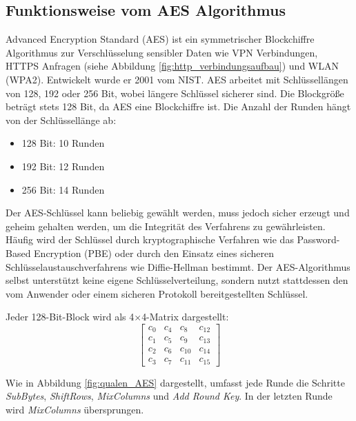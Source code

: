 \subsection{Funktionsweise vom AES Algorithmus}
\label{sec:aes}
\setlength{\parindent}{0pt}

Advanced Encryption Standard (AES) ist ein symmetrischer Blockchiffre Algorithmus zur 
Verschlüsselung sensibler Daten wie VPN Verbindungen, HTTPS Anfragen 
(siehe Abbildung \ref{fig:http_verbindungsaufbau}) und WLAN (WPA2). 
Entwickelt wurde er 2001 vom NIST. AES arbeitet mit Schlüssellängen von 128, 192 oder 256 Bit, 
wobei längere Schlüssel sicherer sind. Die Blockgröße beträgt stets 128 Bit, da AES eine Blockchiffre 
ist. Die Anzahl der Runden hängt von der Schlüssellänge ab: 
\begin{itemize}
    \item 128 Bit: 10 Runden
    \item 192 Bit: 12 Runden
    \item 256 Bit: 14 Runden
\end{itemize}
Der AES-Schlüssel kann beliebig gewählt werden, muss jedoch sicher erzeugt und geheim gehalten werden, um 
die Integrität des Verfahrens zu gewährleisten. Häufig wird der Schlüssel durch kryptographische Verfahren 
wie das Password-Based Encryption (PBE) oder durch den Einsatz eines sicheren Schlüsselaustauschverfahrens 
wie Diffie-Hellman bestimmt. Der AES-Algorithmus selbst unterstützt keine eigene Schlüsselverteilung, sondern 
nutzt stattdessen den vom Anwender oder einem sicheren Protokoll bereitgestellten Schlüssel.


Jeder 128-Bit-Block wird als 4$\times$4-Matrix dargestellt:
\[
\begin{bmatrix}
c_0  & c_4  & c_8  & c_{12} \\
c_1  & c_5  & c_9  & c_{13} \\
c_2  & c_6  & c_{10} & c_{14} \\
c_3  & c_7  & c_{11} & c_{15}
\end{bmatrix}
\]

Wie in Abbildung \ref{fig:qualen_AES} dargestellt, umfasst jede Runde die Schritte \textit{SubBytes}, \textit{ShiftRows}, \textit{MixColumns} und \textit{Add Round Key}. 
In der letzten Runde wird \textit{MixColumns} über\-sprungen.\cite{AES_Algorithmus_2}\cite{AES_Algorithmus_3}\cite{AES_Algorithmus}\cite{Blockchiffre}

